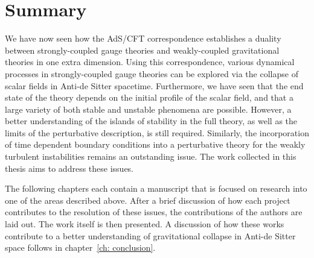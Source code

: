 \documentclass[../PhD.tex]{subfiles}
\begin{document}
\section{Summary}
\label{sec: summary}

We have now seen how the AdS/CFT correspondence establishes a duality between strongly-coupled gauge theories and weakly-coupled gravitational theories in one extra dimension. Using this correspondence, various dynamical processes in strongly-coupled gauge theories can be explored via the collapse of scalar fields in Anti-de Sitter spacetime. Furthermore, we have seen that the end state of the theory depends on the initial profile of the scalar field, and that a large variety of both stable and unstable phenomena are possible. However, a better understanding of the islands of stability in the full theory, as well as the limits of the perturbative description, is still required. Similarly, the incorporation of time dependent boundary conditions into a perturbative theory for the weakly turbulent instabilities remains an outstanding issue. The work collected in this thesis aims to address these issues.

The following chapters each contain a manuscript that is focused on research into one of the areas described above. After a brief discussion of how each project contributes to the resolution of these issues, the contributions of the authors are laid out. The work itself is then presented. A discussion of how these works contribute to a better understanding of gravitational collapse in Anti-de Sitter space follows in chapter~\ref{ch: conclusion}.

\end{document}

